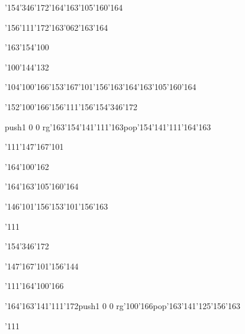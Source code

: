 \null\vfill\ipa\centerline{\enskip\enskip\enskip\enskip\char'154\char'346\char'172\enskip\char'164\char'163\char'105\char'160\char'164}\medskip\centerline{\enskip\enskip\enskip\char'156\char'111\char'172\enskip\char'163\char'062\char'163\char'164\enskip\enskip\enskip}\medskip\centerline{\enskip\enskip\enskip\char'163\char'154\char'100\enskip\enskip\enskip\enskip\enskip\enskip}\medskip\centerline{\enskip\enskip\enskip\enskip\char'100\char'144\char'132\enskip\enskip\enskip\enskip\enskip\enskip\enskip}\medskip\centerline{\enskip\char'104\char'100\char'166\enskip\char'153\char'167\char'101\char'156\char'163\enskip\char'164\char'163\char'105\char'160\char'164\enskip\enskip\enskip}\medskip\centerline{\enskip\enskip\enskip\char'152\char'100\char'166\enskip\char'156\char'111\char'156\enskip\char'154\char'346\char'172\enskip\enskip\enskip}\medskip\centerline{\enskip\pdfcolorstack\match push{1 0 0 rg}\char'163\char'154\char'141\char'111\char'163\pdfcolorstack\match pop{}\enskip\enskip\enskip\enskip\char'154\char'141\char'111\char'164\char'163\enskip\enskip\enskip}\medskip\centerline{\enskip\char'111\enskip\char'147\char'167\char'101\enskip\enskip\enskip\enskip\enskip\enskip}\medskip\centerline{\enskip\enskip\enskip\enskip\enskip\enskip\enskip\char'164\char'100\char'162\enskip\enskip\enskip\enskip\enskip}\medskip\vfill\footline{\hfil\tt\folio\hfil}\eject
\null\vfill\ipa\centerline{\enskip\enskip\enskip\enskip\enskip\enskip\enskip\enskip\char'164\char'163\char'105\char'160\char'164}\medskip\centerline{\enskip\enskip\enskip\char'146\char'101\char'156\enskip\char'153\char'101\char'156\char'163\enskip\enskip\enskip}\medskip\centerline{\enskip\char'111\enskip\enskip\enskip\enskip\enskip\enskip\enskip\enskip\enskip\enskip}\medskip\centerline{\enskip\enskip\enskip\enskip\enskip\enskip\enskip\enskip\enskip\enskip\enskip\char'154\char'346\char'172}\medskip\centerline{\enskip\enskip\enskip\enskip\enskip\enskip\enskip\enskip\enskip\enskip\enskip\char'147\char'167\char'101\char'156\char'144\enskip\enskip\enskip}\medskip\centerline{\enskip\char'111\enskip\char'164\char'100\char'166\enskip\enskip\enskip\enskip\enskip\enskip\enskip\enskip\enskip\enskip\enskip}\medskip\centerline{\enskip\char'164\char'163\char'141\char'111\char'172\enskip\pdfcolorstack\match push{1 0 0 rg}\char'100\char'166\pdfcolorstack\match pop{}\enskip\char'163\char'141\char'125\char'156\char'163\enskip\enskip\enskip}\medskip\centerline{\enskip\char'111\enskip\enskip\enskip\enskip\enskip\enskip\enskip\enskip\enskip\enskip}\medskip\centerline{\enskip\enskip\enskip\enskip\enskip\enskip\enskip\enskip\enskip\enskip\enskip\enskip\enskip\enskip\enskip}\medskip\vfill\footline{\hfil\tt\folio\hfil}\eject
